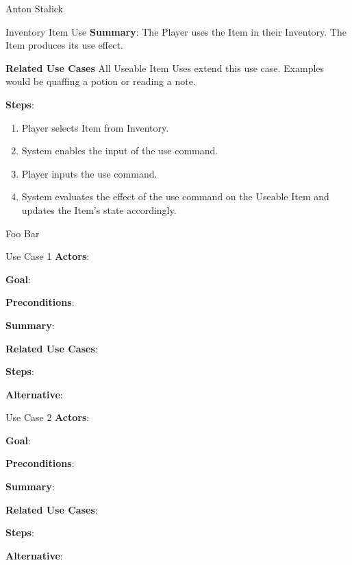 \documentclass[12pt]{report}
\begin{document}
\begin{section}{Anton Stalick}
\begin{subsection}{Inventory Item Use}
\textbf{Summary}:
The Player uses the Item in their Inventory. The Item produces its
use effect.

\textbf{Related Use Cases}
All Useable Item Uses extend this use case. Examples would be quaffing
a potion or reading a note.

\textbf{Steps}:
\begin{enumerate}
\item Player selects Item from Inventory.
\item System enables the input of the use command.
\item Player inputs the use command.
\item System evaluates the effect of the use command on the
Useable Item and updates the Item's state accordingly.
\end{enumerate}

\end{subsection}
\end{section}

\begin{section}{Foo Bar}
\begin{subsection}{Use Case 1}
\textbf{Actors}:

\textbf{Goal}:

\textbf{Preconditions}:

\textbf{Summary}:

\textbf{Related Use Cases}:

\textbf{Steps}:

\textbf{Alternative}:
\end{subsection}

\begin{subsection}{Use Case 2}
\textbf{Actors}:

\textbf{Goal}:

\textbf{Preconditions}:

\textbf{Summary}:

\textbf{Related Use Cases}:

\textbf{Steps}:

\textbf{Alternative}:
\end{subsection}
\end{section}
\end{document}
